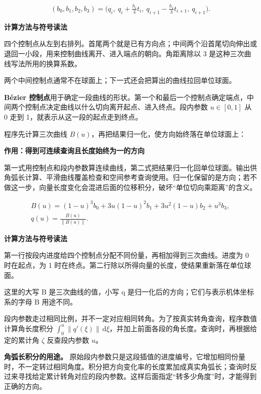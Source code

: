 \documentclass[12pt,a4paper]{article}
\numberwithin{equation}{topic}
\begin{document}
\begin{equation}
\label{eq:control-points}
(b_0,b_1,b_2,b_3)=
\bigl(q_i,\ q_i+\tfrac{h_i}{3}t_i,\
q_{i+1}-\tfrac{h_i}{3}t_{i+1},\ q_{i+1}\bigr).
\end{equation}

\noindent\textbf{计算方法与符号读法}\par\nobreak
四个控制点从左到右排列。首尾两个就是已有方向点；中间两个沿首尾切向伸出或退回一小段，用来控制曲线离开、进入端点的朝向。角距离除以 3 是这种三次曲线写法所用的换算系数。

两个中间控制点通常不在球面上；下一式还会把算出的曲线拉回单位球面。


\textbf{Bézier 控制点}用于确定一段曲线的形状。第一个和最后一个控制点确定端点，中间两个控制点决定曲线以什么切向离开起点、进入终点。段内参数 \(u\in[0,1]\) 从 0 走到 1，就表示从这一段的起点走到终点。

程序先计算三次曲线 \(B(u)\)，再把结果归一化，使方向始终落在单位球面上：

\noindent\textbf{作用：得到可连续查询且长度始终为一的方向}\par\nobreak
第一式用控制点和段内参数算连续曲线，第二式把结果归一化回单位球面。输出供角弧长计算、平滑曲线覆盖检查和空间参考查询使用。归一化保留的是方向；若不做这一步，向量长度变化会混进后面的位移积分，破坏“单位切向乘距离”的含义。

\begin{equation}
\label{eq:normalize}
\begin{gathered}
B(u)=(1-u)^3 b_0+3u(1-u)^2b_1+3u^2(1-u)b_2+u^3b_3,
\\
q(u)=\frac{B(u)}{\|B(u)\|}.
\end{gathered}
\end{equation}

\noindent\textbf{计算方法与符号读法}\par\nobreak
第一行按段内进度给四个控制点分配不同份量，再相加得到三次曲线。进度为 0 时在起点，为 1 时在终点。第二行除以所得向量的长度，使结果重新落在单位球面。

这里的大写 B 是三次曲线的值，小写 q 是归一化后的方向；它们与表示机体坐标系的字母 B 用途不同。


段内参数走过相同比例，并不一定对应相同转角。为了按真实转角查询，程序数值计算角长度积分 \(\int_0^u\|q'(\xi)\|\,\mathrm d\xi\)，并加上前面各段的角长度。查询时，再根据给定的累计角 \(\zeta\) 反查段内参数 \(u\)。

\textbf{角弧长积分的用途。} 原始段内参数只是这段插值的进度编号，它增加相同份量时，不一定转过相同角度。积分把方向变化率的长度累加成真实角弧长；查询时反过来寻找给定累计转角对应的段内参数。这样后面指定“转多少角度”时，才能得到正确的方向。
\end{document}
